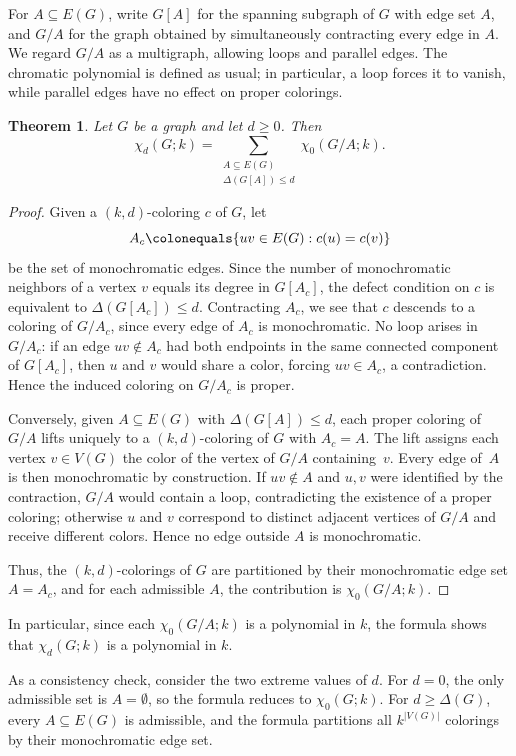 \documentclass[12pt,reqno]{amsart}
\newtheorem{thm}{Theorem}[section]
\theoremstyle{definition}
\begin{document}
For $A\subseteq E(G)$, write $G[A]$ for the spanning subgraph of $G$ with edge set $A$, and $G/A$ for the graph obtained by simultaneously contracting every edge in $A$. We regard $G/A$ as a multigraph, allowing loops and parallel edges. The chromatic polynomial is defined as usual; in particular, a loop forces it to vanish, while parallel edges have no effect on proper colorings.

\begin{thm}\label{thm:general-contraction}
Let $G$ be a graph and let $d\geq 0$. Then
\[
\chi_d(G;k)=\sum_{\substack{A\subseteq E(G)\\ \Delta(G[A])\leq d}} \chi_0(G/A;k).
\]
\end{thm}

\begin{proof}
Given a $(k,d)$-coloring $c$ of $G$, let
\[
A_c\colonequals \{uv\in E(G): c(u)=c(v)\}
\]
be the set of monochromatic edges. Since the number of monochromatic neighbors of a vertex $v$ equals its degree in $G[A_c]$, the defect condition on $c$ is equivalent to $\Delta(G[A_c])\leq d$. Contracting $A_c$, we see that $c$ descends to a coloring of $G/A_c$, since every edge of $A_c$ is monochromatic. No loop arises in $G/A_c$: if an edge $uv\notin A_c$ had both endpoints in the same connected component of $G[A_c]$, then $u$ and $v$ would share a color, forcing $uv\in A_c$, a contradiction. Hence the induced coloring on $G/A_c$ is proper.

Conversely, given $A\subseteq E(G)$ with $\Delta(G[A])\leq d$, each proper coloring of $G/A$ lifts uniquely to a $(k,d)$-coloring of $G$ with $A_c=A$. The lift assigns each vertex $v\in V(G)$ the color of the vertex of $G/A$ containing~$v$. Every edge of~$A$ is then monochromatic by construction. If $uv\notin A$ and $u,v$ were identified by the contraction, $G/A$ would contain a loop, contradicting the existence of a proper coloring; otherwise $u$ and $v$ correspond to distinct adjacent vertices of $G/A$ and receive different colors. Hence no edge outside $A$ is monochromatic.

Thus, the $(k, d)$-colorings of $G$ are partitioned by their monochromatic edge set $A=A_{c}$, and for each admissible $A$, the contribution is $\chi_0(G/A;k)$.
\end{proof}

In particular, since each $\chi_0(G/A;k)$ is a polynomial in $k$, the formula shows that $\chi_d(G;k)$ is a polynomial in $k$.

As a consistency check, consider the two extreme values of $d$. For $d=0$, the only admissible set is $A=\emptyset$, so the formula reduces to $\chi_0(G;k)$. For $d\geq \Delta(G)$, every $A\subseteq E(G)$ is admissible, and the formula partitions all $k^{|V(G)|}$ colorings by their monochromatic edge set.
\end{document}
